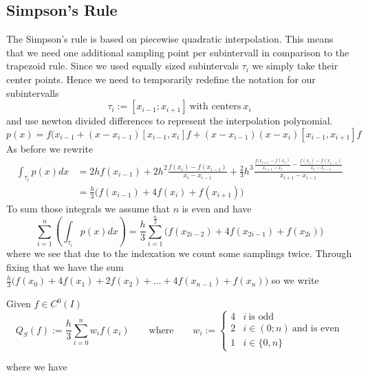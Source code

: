 \subsection{Simpson's Rule}
The Simpson's rule is based on piecewise quadratic interpolation.
This means that we need one additional sampling point per subintervall in comparison to the trapezoid rule.
Since we used equally sized subintervals \(\tau_i\) we simply take their center points.
Hence we need to temporarily redefine the notation for our subintervalls
\[\tau_i := [x_{i-1}; x_{i+1}]~\text{with centers}~x_i\]
and use newton divided differences to represent the interpolation polynomial.
\[p(x) = f(x_{i-1} + (x - x_{i-1}) [x_{i-1}, x_i]f + (x - x_{i-1})(x - x_i)[x_{i-1}, x_{i+1}]f\]
As before we rewrite
\begin{equation*}
   \begin{split}
      \int_{\tau_i} p(x) dx & = 2hf(x_{i-1}) + 2h^2 \frac{f(x_i) - f(x_{i-1})}{x_i - x_{i-1}} + \frac{2}{3}h^3 \frac{\frac{f(x_{i+1} - f(x_i)}{x_{i+1} - x_i} - \frac{f(x_i) - f(x_{i-1})}{x_i - x_{i-1}}}{x_{i+1} - x_{i-1}} \\
                            & = \frac{h}{3} \big(f(x_{i-1}) + 4f(x_i) + f(x_{i+1})\big)
   \end{split}
\end{equation*}
To sum those integrals we assume that \(n\) is even and have
\[\sum_{i=1}^n \left(\int_{\tau_i} p(x) dx\right) = \frac{h}{3}\sum_{i=1}^\frac{n}{2} \big(f(x_{2i-2}) + 4f(x_{2i-1}) + f(x_{2i})\big)\]
where we see that due to the indexation we count some samplings twice.
Through fixing that we have the sum \(\frac{h}{3} \big(f(x_0) + 4f(x_1) + 2f(x_2) + \ldots + 4f(x_{n-1}) + f(x_n)\big)\) so we write
\begin{definition}
   Given \(f \in C^0(I)\)
   \[Q_S(f) := \frac{h}{3} \sum_{i=0}^n w_i f(x_i) \qquad\text{where}\qquad w_i := \begin{cases}4 & i~\text{is odd}\\2 & i \in (0; n)~\text{and is even}\\ 1 & i \in \{0, n\}\end{cases}\]
\end{definition}
where we have


